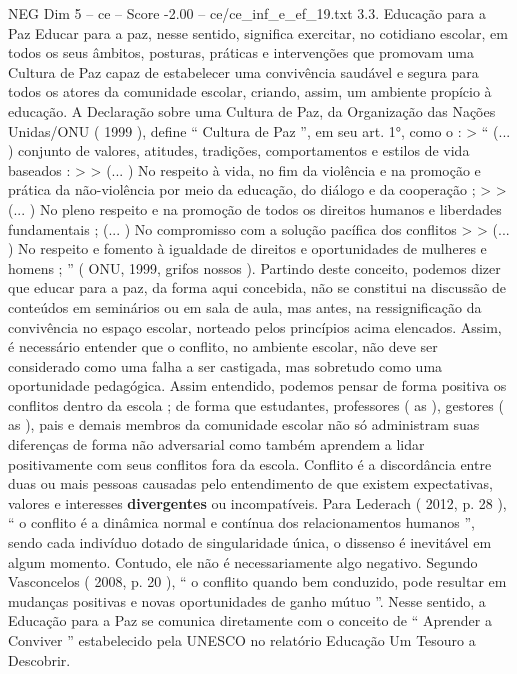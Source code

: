 \begin{textsample}{NEG Dim 5 – ce – Score -2.00 – ce/ce\_inf\_e\_ef\_19.txt}  \label{ex:f5_neg_037}
3.3.
Educação para a Paz Educar para a paz, nesse sentido, significa exercitar, no cotidiano escolar, em todos os seus âmbitos, posturas, práticas e intervenções que promovam uma Cultura de Paz capaz de estabelecer uma convivência saudável e segura para todos os atores da comunidade escolar, criando, assim, um ambiente propício à educação.
A Declaração sobre uma Cultura de Paz, da Organização das Nações Unidas/ONU ( 1999 ), define “ Cultura de Paz ”, em seu art. 1{\EmojiFont °}, como o : > “ (... ) conjunto de valores, atitudes, tradições, comportamentos e estilos de vida baseados : > > (... ) No respeito à vida, no fim da violência e na promoção e prática da não-violência por meio da educação, do diálogo e da cooperação ; > > (... ) No pleno respeito e na promoção de todos os direitos humanos e liberdades fundamentais ; (... ) No compromisso com a solução pacífica dos conflitos > > (... ) No respeito e fomento à igualdade de direitos e oportunidades de mulheres e homens ; ” ( ONU, 1999, grifos nossos ).
Partindo deste conceito, podemos dizer que educar para a paz, da forma aqui concebida, não se constitui na discussão de conteúdos em seminários ou em sala de aula, mas antes, na ressignificação da convivência no espaço escolar, norteado pelos princípios acima elencados.
Assim, é necessário entender que o conflito, no ambiente escolar, não deve ser considerado como uma falha a ser castigada, mas sobretudo como uma oportunidade pedagógica.
Assim entendido, podemos pensar de forma positiva os conflitos dentro da escola ; de forma que estudantes, professores ( as ), gestores ( as ), pais e demais membros da comunidade escolar não só administram suas diferenças de forma não adversarial como também aprendem a lidar positivamente com seus conflitos fora da escola.
Conflito é a discordância entre duas ou mais pessoas causadas pelo entendimento de que existem expectativas, valores e interesses \textbf{divergentes} ou incompatíveis.
Para Lederach ( 2012, p. 28 ), “ o conflito é a dinâmica normal e contínua dos relacionamentos humanos ”, sendo cada indivíduo dotado de singularidade única, o dissenso é inevitável em algum momento.
Contudo, ele não é necessariamente algo negativo.
Segundo Vasconcelos ( 2008, p. 20 ), “ o conflito quando bem conduzido, pode resultar em mudanças positivas e novas oportunidades de ganho mútuo ”.
Nesse sentido, a Educação para a Paz se comunica diretamente com o conceito de “ Aprender a Conviver ” estabelecido pela UNESCO no relatório Educação Um Tesouro a Descobrir.

\end{textsample}
